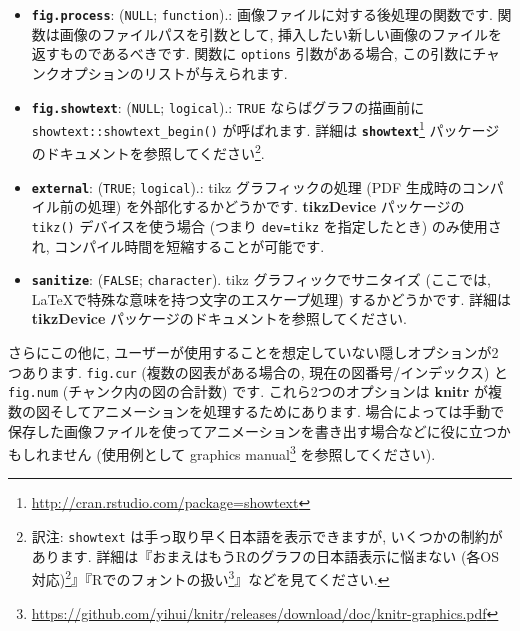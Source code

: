 \documentclass[
  11pt,
]{bxjsreport}
\renewcommand{\href}[2]{#2\footnote{\url{#1}}}
\begin{document}
\begin{itemize}
  \textbf{\texttt{fig.sep}}: (\texttt{NULL}; \texttt{character}).: subfigures どうしの間に挿入されるセパレータを指定する文字ベクトルです. \texttt{fig.ncol} が指定された場合, デフォルトでは \texttt{fig.sep} に N 個ごとに \texttt{\textbackslash{}newline} が挿入されます (\texttt{N} は列の数です). 例えば \texttt{fig.ncol = 2} ならばデフォルトは \texttt{fig.sep = c(\textquotesingle{}\textquotesingle{},\ \textquotesingle{}\textquotesingle{},\ \textquotesingle{}\textbackslash{}\textbackslash{}newline\textquotesingle{},\ \textquotesingle{}\textquotesingle{},\ \textquotesingle{}\textquotesingle{},\ \textquotesingle{}\textbackslash{}\textbackslash{}newline\textquotesingle{},\ \textquotesingle{}\textquotesingle{},\ ...)} となります.
\item
  \textbf{\texttt{fig.process}}: (\texttt{NULL}; \texttt{function}).: 画像ファイルに対する後処理の関数です. 関数は画像のファイルパスを引数として, 挿入したい新しい画像のファイルを返すものであるべきです. 関数に \texttt{options} 引数がある場合, この引数にチャンクオプションのリストが与えられます.
\item
  \textbf{\texttt{fig.showtext}}: (\texttt{NULL}; \texttt{logical}).: \texttt{TRUE} ならばグラフの描画前に \texttt{showtext::showtext\_begin()} が呼ばれます. 詳細は \href{http://cran.rstudio.com/package=showtext}{\textbf{\texttt{showtext}}} パッケージのドキュメントを参照してください\footnote{訳注: \texttt{showtext} は手っ取り早く日本語を表示できますが, いくつかの制約があります. 詳細は『\href{https://ill-identified.hatenablog.com/entry/2020/10/03/200618}{おまえはもうRのグラフの日本語表示に悩まない (各OS対応)}』『\href{https://oku.edu.mie-u.ac.jp/~okumura/stat/font.html}{Rでのフォントの扱い}』などを見てください.}.
\item
  \textbf{\texttt{external}}: (\texttt{TRUE}; \texttt{logical}).: tikz グラフィックの処理 (PDF 生成時のコンパイル前の処理) を外部化するかどうかです. \textbf{tikzDevice} パッケージの \texttt{tikz()} デバイスを使う場合 (つまり \texttt{dev=\textquotesingle{}tikz\textquotesingle{}} を指定したとき) のみ使用され, コンパイル時間を短縮することが可能です.
\item
  \textbf{\texttt{sanitize}}: (\texttt{FALSE}; \texttt{character}). tikz グラフィックでサニタイズ (ここでは, LaTeXで特殊な意味を持つ文字のエスケープ処理) するかどうかです. 詳細は \textbf{tikzDevice} パッケージのドキュメントを参照してください.
\end{itemize}

さらにこの他に, ユーザーが使用することを想定していない隠しオプションが2つあります. \texttt{fig.cur} (複数の図表がある場合の, 現在の図番号/インデックス) と \texttt{fig.num} (チャンク内の図の合計数) です. これら2つのオプションは \textbf{knitr} が複数の図そしてアニメーションを処理するためにあります. 場合によっては手動で保存した画像ファイルを使ってアニメーションを書き出す場合などに役に立つかもしれません (使用例として \href{https://github.com/yihui/knitr/releases/download/doc/knitr-graphics.pdf}{graphics manual} を参照してください).
\end{document}
